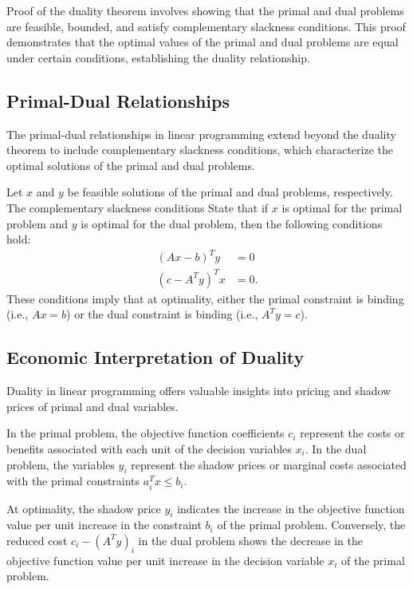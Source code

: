 \documentclass[12pt]{book} %
\begin{document}
Proof of the duality theorem involves showing that the primal and dual problems are feasible, bounded, and satisfy complementary slackness conditions. This proof demonstrates that the optimal values of the primal and dual problems are equal under certain conditions, establishing the duality relationship.

\subsection{Primal-Dual Relationships}
The primal-dual relationships in linear programming extend beyond the duality theorem to include complementary slackness conditions, which characterize the optimal solutions of the primal and dual problems.

Let \(x\) and \(y\) be feasible solutions of the primal and dual problems, respectively. The complementary slackness conditions State that if \(x\) is optimal for the primal problem and \(y\) is optimal for the dual problem, then the following conditions hold:
\begin{align*}
(Ax - b)^T y & = 0 \\
(c - A^T y)^T x & = 0.
\end{align*}
These conditions imply that at optimality, either the primal constraint is binding (i.e., \(Ax = b\)) or the dual constraint is binding (i.e., \(A^T y = c\)).

\subsection{Economic Interpretation of Duality}

Duality in linear programming offers valuable insights into pricing and shadow prices of primal and dual variables.

In the primal problem, the objective function coefficients \(c_i\) represent the costs or benefits associated with each unit of the decision variables \(x_i\). In the dual problem, the variables \(y_i\) represent the shadow prices or marginal costs associated with the primal constraints \(a_i^T x \leq b_i\).

At optimality, the shadow price \(y_i\) indicates the increase in the objective function value per unit increase in the constraint \(b_i\) of the primal problem. Conversely, the reduced cost \(c_i - (A^T y)_i\) in the dual problem shows the decrease in the objective function value per unit increase in the decision variable \(x_i\) of the primal problem.
\end{document}
